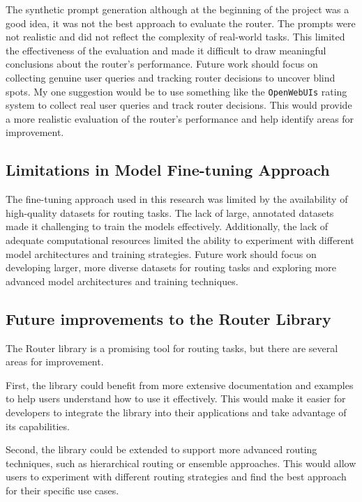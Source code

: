 The synthetic prompt generation although at the beginning of the project was a good idea, it was not the best approach to evaluate the router. The prompts were not realistic and did not reflect the complexity of real-world tasks. This limited the effectiveness of the evaluation and made it difficult to draw meaningful conclusions about the router's performance. Future work should focus on collecting genuine user queries and tracking router decisions to uncover blind spots. My one suggestion would be to use something like the \texttt{OpenWebUIs} rating system to collect real user queries and track router decisions. This would provide a more realistic evaluation of the router's performance and help identify areas for improvement.


\subsection{Limitations in Model Fine-tuning Approach}
\label{sec:results-limitations-in-model-fine-tuning-approach}

The fine-tuning approach used in this research was limited by the availability of high-quality datasets for routing tasks. The lack of large, annotated datasets made it challenging to train the models effectively. Additionally, the lack of adequate computational resources limited the ability to experiment with different model architectures and training strategies. Future work should focus on developing larger, more diverse datasets for routing tasks and exploring more advanced model architectures and training techniques.

\subsection{Future improvements to the Router Library}
\label{sec:results-future-improvements-to-the-router-library}

The Router library is a promising tool for routing tasks, but there are several areas for improvement.

First, the library could benefit from more extensive documentation and examples to help users understand how to use it effectively. This would make it easier for developers to integrate the library into their applications and take advantage of its capabilities.

Second, the library could be extended to support more advanced routing techniques, such as hierarchical routing or ensemble approaches. This would allow users to experiment with different routing strategies and find the best approach for their specific use cases.

